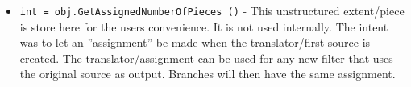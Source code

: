 \begin{itemize}
\item  \verb|int = obj.GetAssignedNumberOfPieces ()| -  This unstructured extent/piece is store here for the users convenience.
 It is not used internally.  The intent was to let an ''assignment'' be made
 when the translator/first source is created.  The translator/assignment
 can be used for any new filter that uses the original source as output.
 Branches will then have the same assignment.

\end{itemize}
